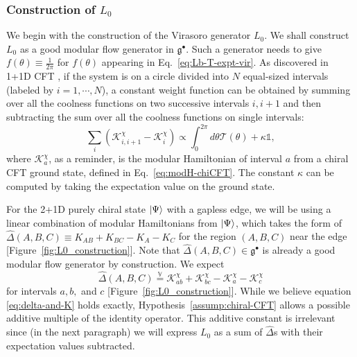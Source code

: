 \documentclass[12pt, nofootinbib]{article}
\theoremstyle{plain}
\theoremstyle{assumption}
\theoremstyle{definition}
\theoremstyle{plain}
\theoremstyle{plain}
\theoremstyle{plain}
\theoremstyle{plain}
\theoremstyle{plain}
\def\veq{\stackrel{\mathbb{V}}{=}}
\def\Kcft{\mathscr{K}}
\def\Tcft{\mathscr{T}}
\def\({\left(}
\def\){\right)}
\begin{document}
\label{subsec:explicit-vir}

\subsubsection{Construction of $L_0$}
\label{subsubsec:L0}
We begin with the construction of the Virasoro generator $L_0$. We shall construct $L_0$ as a good modular flow generator in $\mathfrak{g}^\bullet$. Such a generator needs to give $f(\theta)\equiv \frac{1}{2\pi}$ for $f(\theta)$ 
appearing in Eq.~\eqref{eq:Lb-T-expt-vir}.
As discovered in 1+1D CFT \cite{Lin2023}, if the system is on a circle divided into $N$ equal-sized intervals (labeled by $i=1,\cdots,N$), a constant weight function can be obtained by summing over all the coolness functions on two successive intervals $i,i+1$ and then subtracting the sum over all the coolness functions on single intervals: 
\begin{equation}\label{eq:K2-K1}
    \sum_{i} \( \Kcft^{\chi}_{i,i+1} - \Kcft^{\chi}_{i}\)  \propto \int_0^{2\pi} d\theta \Tcft(\theta)+\kappa \mathbb{1},
\end{equation}
where $\Kcft^{\chi}_{a}$, as a reminder, is the modular Hamiltonian of interval $a$ from a chiral CFT ground state, defined in Eq.~\eqref{eq:modH-chiCFT}. The constant $\kappa$ can be computed by taking the expectation value on the ground state. 

For the 2+1D purely chiral state $\left|\Psi\right\rangle$ with a gapless edge, we will be using a linear combination of modular Hamiltonians from $\left|\Psi\right\rangle$, which takes the form of $\hat{\Delta}(A,B,C)\equiv K_{AB} + K_{BC}-K_{A}-K_{C} $ for the region $(A,B,C)$ near the edge [Figure~\ref{fig:L0_construction}]. Note that $\hat{\Delta}(A,B,C) \in \mathfrak{g}^\bullet$ is already a good modular flow generator by construction. 
We expect
\begin{equation}\label{eq:delta-and-K}
    \hat{\Delta}(A,B,C)\veq \Kcft_{ab}^{\chi} + \Kcft_{bc}^{\chi} - \Kcft_a^{\chi} - \Kcft_c^{\chi}
\end{equation}
for intervals $a, b,$ and $c$ [Figure~\ref{fig:L0_construction}]. 
While we believe equation \eqref{eq:delta-and-K} holds exactly, Hypothesis~\ref{assump:chiral-CFT} allows a possible additive multiple of the identity operator.  
This additive constant is irrelevant since (in the next paragraph) we will express $L_0$ as a sum of $\hat{\Delta}$s with their expectation values subtracted.  
\end{document}
